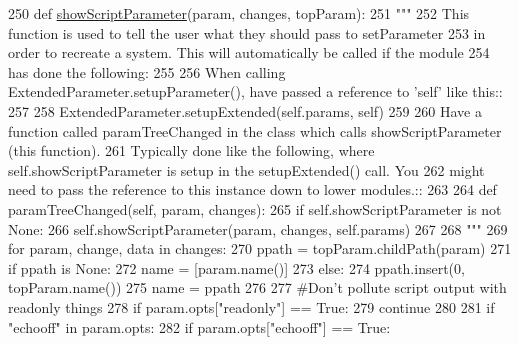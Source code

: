 \begin{DoxyCode}
250     \textcolor{keyword}{def }\hyperlink{classsoftware_1_1chipwhisperer_1_1common_1_1api_1_1ExtendedParameter_1_1ExtendedParameter_af7cd4372c3875a880302b2c80989a1fe}{showScriptParameter}(param,  changes, topParam):
251         \textcolor{stringliteral}{"""}
252 \textcolor{stringliteral}{        This function is used to tell the user what they should pass to setParameter}
253 \textcolor{stringliteral}{        in order to recreate a system. This will automatically be called if the module}
254 \textcolor{stringliteral}{        has done the following:}
255 \textcolor{stringliteral}{}
256 \textcolor{stringliteral}{        When calling ExtendedParameter.setupParameter(), have passed a reference to 'self' like this::}
257 \textcolor{stringliteral}{}
258 \textcolor{stringliteral}{           ExtendedParameter.setupExtended(self.params, self)}
259 \textcolor{stringliteral}{}
260 \textcolor{stringliteral}{        Have a function called paramTreeChanged in the class which calls showScriptParameter (this
       function).}
261 \textcolor{stringliteral}{        Typically done like the following, where self.showScriptParameter is setup in the setupExtended()
       call. You}
262 \textcolor{stringliteral}{        might need to pass the reference to this instance down to lower modules.::}
263 \textcolor{stringliteral}{}
264 \textcolor{stringliteral}{            def paramTreeChanged(self, param, changes):}
265 \textcolor{stringliteral}{                if self.showScriptParameter is not None:}
266 \textcolor{stringliteral}{                    self.showScriptParameter(param, changes, self.params)}
267 \textcolor{stringliteral}{}
268 \textcolor{stringliteral}{        """}
269         \textcolor{keywordflow}{for} param, change, data \textcolor{keywordflow}{in} changes:
270             ppath = topParam.childPath(param)
271             \textcolor{keywordflow}{if} ppath \textcolor{keywordflow}{is} \textcolor{keywordtype}{None}:
272                 name = [param.name()]
273             \textcolor{keywordflow}{else}:
274                 ppath.insert(0, topParam.name())
275                 name = ppath
276 
277             \textcolor{comment}{#Don't pollute script output with readonly things}
278             \textcolor{keywordflow}{if} param.opts[\textcolor{stringliteral}{"readonly"}] == \textcolor{keyword}{True}:
279                 \textcolor{keywordflow}{continue}
280 
281             \textcolor{keywordflow}{if} \textcolor{stringliteral}{"echooff"} \textcolor{keywordflow}{in} param.opts:
282                 \textcolor{keywordflow}{if} param.opts[\textcolor{stringliteral}{"echooff"}] == \textcolor{keyword}{True}:

\end{DoxyCode}
